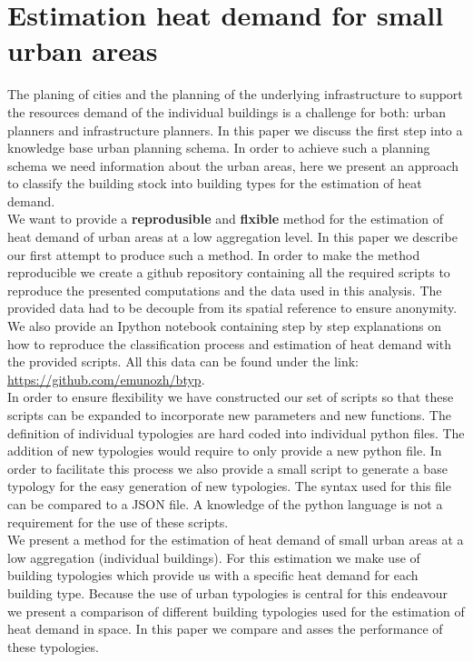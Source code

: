 \section{Estimation heat demand for small urban areas}

The planing of cities and the planning of the underlying infrastructure to
support the resources demand of the individual buildings is a challenge for both: urban
planners and infrastructure planners. In this paper we discuss the first step
into a knowledge base urban planning schema. In order to achieve such a
planning schema we need information about the urban areas, here we present an
approach to classify the building stock into building types for the estimation of heat demand.\\

We want to provide a \textbf{reprodusible} and \textbf{flxible} method for the
estimation of heat demand of urban areas at a low aggregation level. In this
paper we describe our first attempt to produce such a method. In order to make
the method reproducible we create a github repository containing all the
required scripts to reproduce the presented computations and the data used in
this analysis. The provided data had to be decouple from its spatial reference
to ensure anonymity. We also provide an Ipython notebook containing step by
step explanations on how to reproduce the classification process and estimation
of heat demand with the provided scripts. All this data can be found under the
link: \url{https://github.com/emunozh/btyp}.\\

In order to ensure flexibility we have constructed our set of scripts so that
these scripts can be expanded to incorporate new parameters and new functions.
The definition of individual typologies are hard coded into individual python
files. The addition of new typologies would require to only provide a new
python file. In order to facilitate this process we also provide a small script
to generate a base typology for the easy generation of new typologies.
The syntax used for this file can be compared to a JSON file. A knowledge of the
python language is not a requirement for the use of these scripts.\\

We present a method for the estimation of heat demand of small urban areas at a
low aggregation (individual buildings). For this estimation we make use of
building typologies which provide us with a specific heat demand for each
building type. Because the use of urban typologies is central for this
endeavour we present a comparison of different building typologies used for the
estimation of heat demand in space. In this paper we compare and asses the
performance of these typologies.\\

